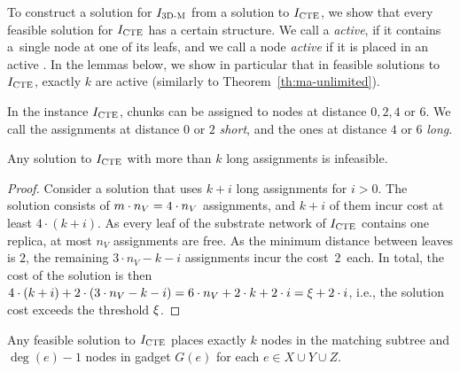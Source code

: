 To construct a solution for $I_{\mathrm{\textsc{3D-M}}}$ from a solution to $I_{\mathrm{\textsc{CTE}}}$, we show that every feasible solution for $I_{\mathrm{\textsc{CTE}}}$ has a certain structure.
We call a {\TripleGadget} \textit{active}, if it contains a~single node at one of its leafs, and we call a node \textit{active} if it is placed in an active {\TripleGadget}.
In the lemmas below, we show in particular that in feasible solutions to $I_{\mathrm{\textsc{CTE}}}$, exactly $k$ \TripleGadgets{} are active (similarly to Theorem~\ref{th:ma-unlimited}).


In the instance $I_{\mathrm{\textsc{CTE}}}$, chunks can be assigned to nodes at distance $0, 2, 4$ or $6$.
We call the assignments at distance $0$ or $2$ \emph{short}, and the ones at distance $4$ or $6$ \emph{long}.


  \begin{lemma}
    Any solution to $I_{\mathrm{\textsc{CTE}}}$ with more than $k$ long assignments is infeasible.
    \label{lem:infeasible}
  \end{lemma}
  \begin{proof}
    Consider a solution that uses $k+i$ long assignments for $i>0$.
    The solution consists of $m \cdot n_V = 4\cdot n_V$ assignments, and $k+i$ of them incur cost at least $4\cdot (k+i)$.
    As every leaf of the substrate network of $I_{\mathrm{\textsc{CTE}}}$ contains one replica, at most $n_V$ assignments are free.
    As the minimum distance between leaves is $2$, the remaining $3\cdot n_V - k-i$ assignments incur the cost~$2$~each.
    In total, the cost of the solution is then $4\cdot (k+i) + 2\cdot (3\cdot n_V - k-i) = 6\cdot n_V + 2\cdot k + 2\cdot i = \xi + 2\cdot i$, i.e., the solution cost exceeds the threshold $\xi$.
  \end{proof}

  
\begin{lemma}
  Any feasible solution to $I_{\mathrm{\textsc{CTE}}}$ places exactly $k$ nodes in the matching subtree and $\deg(e) - 1$ nodes in gadget $G(e)$ for each $e \in X \cup Y \cup Z$.
  \label{lem:n-matchsubtree-ma}
\end{lemma}

